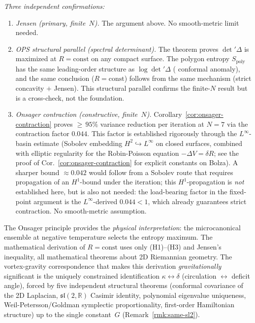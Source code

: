 \begin{remark}
\emph{Three independent confirmations:}
\begin{enumerate}
\item \emph{Jensen (primary, finite~$N$).}
  The argument above.  No smooth-metric limit needed.
\item \emph{OPS structural parallel (spectral determinant).}
  The \citet{OsgoodPhillipsSarnak1988} theorem proves
  $\det'\Delta$ is maximized at $R = \mathrm{const}$
  on any compact surface.
  The polygon entropy $S_{\mathrm{poly}}$ has the same
  leading-order structure as $\log\det'\Delta$
  (\citealp{Polyakov1981} conformal anomaly),
  and the same conclusion ($R = \mathrm{const}$)
  follows from the same mechanism (strict concavity
  $+$ Jensen).  This structural parallel confirms the
  finite-$N$ result but is a cross-check, not the
  foundation.
\item \emph{Onsager contraction (constructive, finite~$N$).}
  Corollary~\ref{cor:onsager-contraction} proves ${\ge}\,95\%$
  variance reduction per iteration at $N = 7$ via the
  contraction factor $0.044$.  This factor is established
  rigorously through the $L^\infty$-basin estimate
  (Sobolev embedding $H^2 \hookrightarrow L^\infty$ on
  closed surfaces, combined with elliptic regularity for
  the Robin-Poisson equation $-\Delta V = \delta R$;
  see the proof of Cor.~\ref{cor:onsager-contraction}
  for explicit constants on Bolza).
  A sharper bound $\approx 0.042$ would follow from a
  Sobolev route that requires propagation of an
  $H^1$-bound under the iteration; this $H^1$-propagation
  is \emph{not} established here, but is also not needed:
  the load-bearing factor in the fixed-point argument is
  the $L^\infty$-derived $0.044 < 1$, which already
  guarantees strict contraction.
  No smooth-metric assumption.
\end{enumerate}
The Onsager principle
\citep{Onsager1949,CagliotiFLMP1992,Kiessling1993}
provides the \emph{physical interpretation}:
the microcanonical ensemble at negative temperature
selects the entropy maximum.
The mathematical derivation of $R = \mathrm{const}$
uses only (H1)--(H3) and Jensen's inequality, all
mathematical theorems about 2D Riemannian geometry.
The vortex-gravity correspondence that makes
this derivation \emph{gravitationally} significant
is the uniquely constrained identification
$\kappa \leftrightarrow \delta$ (circulation
$\leftrightarrow$ deficit angle), forced by five
independent structural theorems
(conformal covariance of the 2D Laplacian,
$\mathfrak{sl}(2,\mathbb{R})$ Casimir identity,
polynomial eigenvalue uniqueness,
Weil-Petersson/Goldman symplectic proportionality,
first-order Hamiltonian structure) up to the single
constant~$G$ (Remark~\ref{rmk:same-sl2}).
\end{remark}

